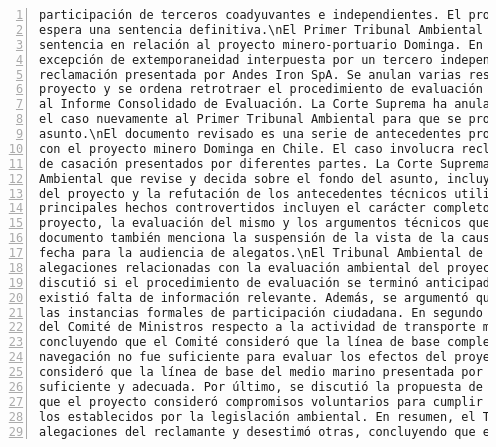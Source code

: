 \begin{Verbatim}[frame=lines, label=Elavoración propia -  Ejemplo de Contexto enviado por el Chatbot a OpenAI
				, fontsize=\scriptsize, numbers=left
				, baselinestretch=0.4
				, formatcom=\color{gray}]
participación de terceros coadyuvantes e independientes. El proceso judicial continúa y se
espera una sentencia definitiva.\nEl Primer Tribunal Ambiental de Chile ha emitido una
sentencia en relación al proyecto minero-portuario Dominga. En la sentencia, se rechaza la
excepción de extemporaneidad interpuesta por un tercero independiente y se acoge la
reclamación presentada por Andes Iron SpA. Se anulan varias resoluciones relacionadas con el
proyecto y se ordena retrotraer el procedimiento de evaluación ambiental a una etapa posterior
al Informe Consolidado de Evaluación. La Corte Suprema ha anulado la sentencia y ha remitido
el caso nuevamente al Primer Tribunal Ambiental para que se pronuncie sobre el fondo del
asunto.\nEl documento revisado es una serie de antecedentes procesales de un caso relacionado
con el proyecto minero Dominga en Chile. El caso involucra reclamaciones judiciales y recursos
de casación presentados por diferentes partes. La Corte Suprema ha ordenado al Tribunal
Ambiental que revise y decida sobre el fondo del asunto, incluyendo la evaluación ambiental
del proyecto y la refutación de los antecedentes técnicos utilizados para rechazarlo. Los
principales hechos controvertidos incluyen el carácter completo de los antecedentes del
proyecto, la evaluación del mismo y los argumentos técnicos que fundamentaron su rechazo. El
documento también menciona la suspensión de la vista de la causa y la fijación de una nueva
fecha para la audiencia de alegatos.\nEl Tribunal Ambiental de Chile revisó una serie de
alegaciones relacionadas con la evaluación ambiental del proyecto Dominga. En primer lugar, se
discutió si el procedimiento de evaluación se terminó anticipadamente, concluyendo que no
existió falta de información relevante. Además, se argumentó que el proyecto cumplió con todas
las instancias formales de participación ciudadana. En segundo lugar, se analizó el criterio
del Comité de Ministros respecto a la actividad de transporte marítimo del proyecto,
concluyendo que el Comité consideró que la línea de base complementaria para las rutas de
navegación no fue suficiente para evaluar los efectos del proyecto. Sin embargo, el Tribunal
consideró que la línea de base del medio marino presentada por el titular del proyecto fue
suficiente y adecuada. Por último, se discutió la propuesta de la Casa del Mar, concluyendo
que el proyecto consideró compromisos voluntarios para cumplir con estándares más altos que
los establecidos por la legislación ambiental. En resumen, el Tribunal acogió algunas
alegaciones del reclamante y desestimó otras, concluyendo que el proyecto Dominga cumplió con

\end{Verbatim}
